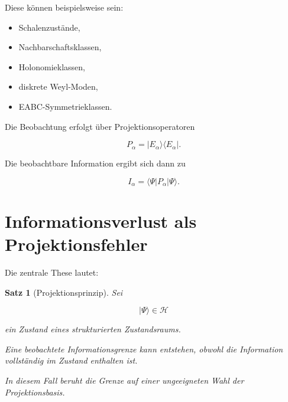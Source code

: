 \documentclass[11pt,a4paper]{article}
\newtheorem{satz}{Satz}
\theoremstyle{remark}
\begin{document}
	Diese können beispielsweise sein:
	
	\begin{itemize}
		\item Schalenzustände,
		\item Nachbarschaftsklassen,
		\item Holonomieklassen,
		\item diskrete Weyl-Moden,
		\item EABC-Symmetrieklassen.
	\end{itemize}
	
	Die Beobachtung erfolgt über Projektionsoperatoren
	
	\begin{equation}
		P_{\alpha}
		=
		|E_{\alpha}\rangle
		\langle E_{\alpha}|.
	\end{equation}
	
	Die beobachtbare Information ergibt sich dann zu
	
	\begin{equation}
		I_{\alpha}
		=
		\langle \Psi|
		P_{\alpha}
		|\Psi\rangle.
	\end{equation}
	
	\section{Informationsverlust als Projektionsfehler}
	
	Die zentrale These lautet:
	
	\begin{satz}[Projektionsprinzip]
		Sei
		
		\[
		|\Psi\rangle
		\in \mathcal H
		\]
		
		ein Zustand eines strukturierten Zustandsraums.
		
		Eine beobachtete Informationsgrenze kann entstehen, obwohl die
		Information vollständig im Zustand enthalten ist.
		
		In diesem Fall beruht die Grenze auf einer ungeeigneten Wahl der
		Projektionsbasis.
	\end{satz}
	
\end{document}
